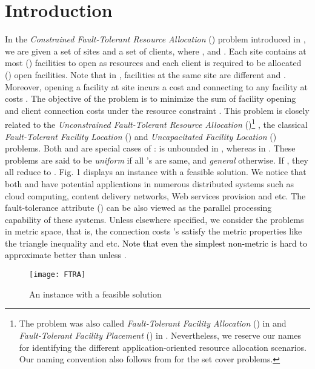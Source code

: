\documentclass[10pt]{llncs}
\begin{document}
\section{Introduction}

In the \textit{Constrained Fault-Tolerant Resource Allocation} ()
problem introduced in \cite{kewen2011cocoon}, we are given a set
 of sites and a set \textcolor{black}{}
of clients, where , 
and . Each site  contains at most
 () facilities to open as resources and each
client  is required to be allocated  ()
open facilities. Note that in , facilities at the same site
are different and .
Moreover, opening a facility at site  incurs a cost  and
connecting  to any facility at  costs . The objective
of the problem is to minimize the sum of facility opening and client
connection costs under the resource constraint . This problem
is closely related to the \textit{Unconstrained Fault-Tolerant Resource
Allocation} ()\footnote{The problem was also called \textit{Fault-Tolerant Facility Allocation
}() in \cite{shihongftfa} and \textit{Fault-Tolerant Facility
Placement }() in \cite{yan2011approximation}. Nevertheless,
we reserve our names for identifying the different application-oriented
resource allocation scenarios. Our naming convention also follows
from \cite{fujito2005better,hua2009exact,kolliopoulos2003approximating}
for the set cover problems.} \cite{kewen2011cocoon}, the classical \textit{Fault-Tolerant Facility
Location }() \cite{Jain00FTFL} and\textit{ Uncapacitated Facility
Location }() \cite{Shmoys97FL} problems. Both 
and  are special cases of :  is unbounded in
, whereas  in
. These problems are said to be \textit{uniform} if all 's
are same, and\textit{ general} otherwise. If ,
they all reduce to . Fig. 1 displays an  instance with
a feasible solution. We notice that both  and 
have potential applications in numerous distributed systems such as
cloud computing, content delivery networks, Web services provision
and etc. The fault-tolerance attribute () can be also viewed
as the parallel processing capability of these systems. Unless elsewhere
specified, we consider the problems in metric space, that is, the
connection costs 's satisfy the metric properties like the
triangle inequality and etc.\textcolor{black}{{} Note that even the
simplest non-metric  is hard to approximate better than 
unless }
\cite{Sviridenko02improved1.58}.

\begin{figure}
\begin{centering}
\texttt{[image: FTRA]}
\par\end{centering}

\caption{An  instance with a feasible solution}
\end{figure}
\end{document}
